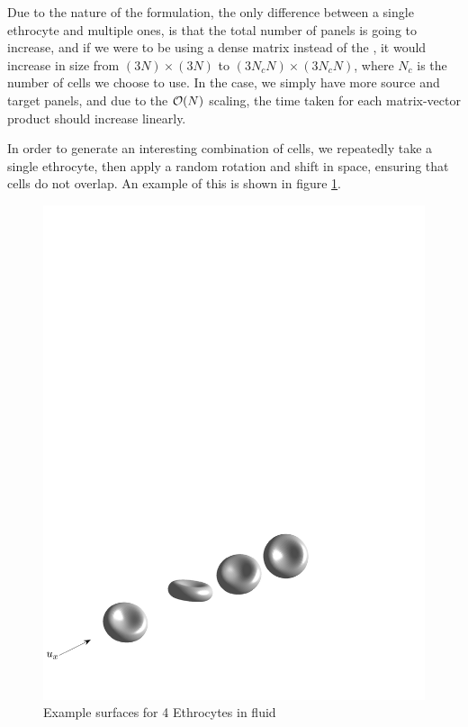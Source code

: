 Due to the nature of the {\bem} formulation, the only difference between a single ethrocyte and multiple ones, is that the total number of panels is going to increase, and if we were to be using a dense matrix instead of the {\fmm}, it would increase in size from $(3N)\times (3N)$ to $(3N_cN)\times (3N_cN)$, where $N_c$ is the number of cells we choose to use. In the {\fmm} case, we simply have more source and target panels, and due to the $\mathcal{O}(N)$ scaling, the time taken for each matrix-vector product should increase linearly.

In order to generate an interesting combination of cells, we repeatedly take a single ethrocyte, then apply a random rotation and shift in space, ensuring that cells do not overlap. An example of this is shown in figure \ref{fig:multiple_cells}.

\begin{figure}
\begin{center}
	\includegraphics[width=14cm]{img/4Cells_arrow.pdf}
	\caption{Example surfaces for 4 Ethrocytes in fluid}
	\label{fig:multiple_cells}
\end{center}
\end{figure}

